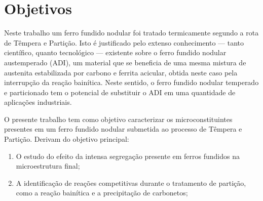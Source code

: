 \chapter{Objetivos}

Neste trabalho um ferro fundido nodular foi tratado termicamente segundo a rota de Têmpera e Partição. Isto é justificado pelo extenso conhecimento --- tanto científico, quanto tecnológico --- existente sobre o ferro fundido nodular austemperado (ADI), um material que se beneficia de uma mesma mistura de austenita estabilizada por carbono e ferrita acicular, obtida neste caso pela interrupção da reação bainítica. Neste sentido, o ferro fundido nodular temperado e particionado tem o potencial de substituir o ADI em uma quantidade de aplicações industriais.

O presente trabalho tem como objetivo caracterizar os microconstituintes presentes em um ferro fundido nodular submetida ao processo de Têmpera e Partição. Derivam do objetivo principal:

\begin{enumerate}
\item O estudo do efeito da intensa segregação presente em ferros fundidos na microestrutura final; 
\item A identificação de reações competitivas durante o tratamento de partição, como a reação bainítica e a precipitação de carbonetos;
\end{enumerate}

